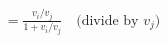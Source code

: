 \documentclass[preview]{standalone}
\begin{document}
\begin{align*}
= \frac{v_i / v_j}{1 + v_i / v_j} \quad \text{(divide by } v_j \text{)}
\end{align*}
\end{document}
